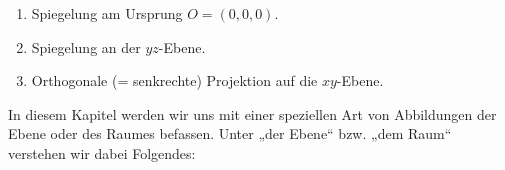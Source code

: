 \begin{LA}
\begin{enumerate}
\begin{enumerate}
    \item Spiegelung am Ursprung \( O = (0,0,0) \).

    \item Spiegelung an der $yz$-Ebene.

    \item Orthogonale (= senkrechte) Projektion auf die $xy$-Ebene.
\end{enumerate}
\end{enumerate}

\end{LA}

\clearpage
In diesem Kapitel werden wir uns mit einer speziellen Art von Abbildungen der Ebene oder des Raumes befassen. Unter „der Ebene“ bzw. „dem Raum“ verstehen wir dabei Folgendes:


